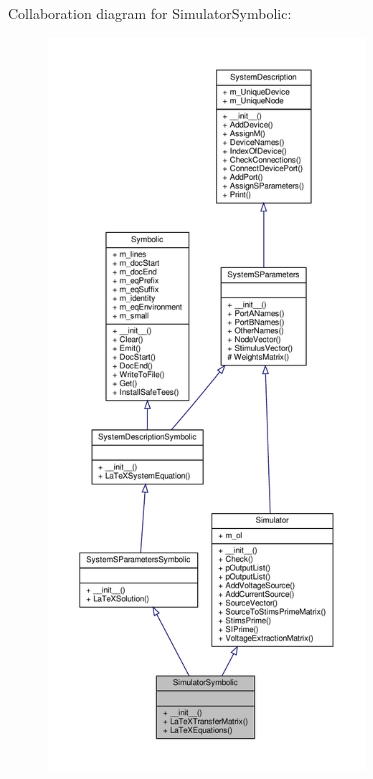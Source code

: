 Collaboration diagram for Simulator\+Symbolic\+:\nopagebreak
\begin{figure}[H]
\begin{center}
\leavevmode
\includegraphics[height=550pt]{classSignalIntegrity_1_1SystemDescriptions_1_1SimulatorSymbolic_1_1SimulatorSymbolic__coll__graph}
\end{center}
\end{figure}

